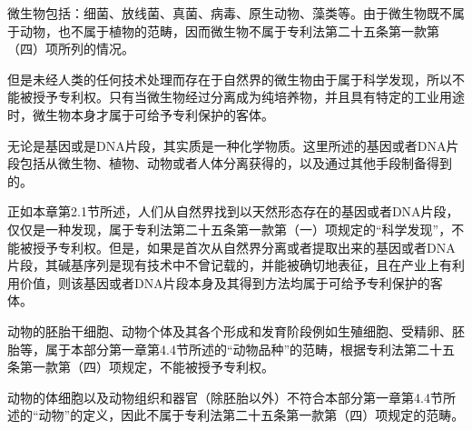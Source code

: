 微生物包括：细菌、放线菌、真菌、病毒、原生动物、藻类等。由于微生物既不属于动物，也不属于植物的范畴，因而微生物不属于专利法第二十五条第一款第（四）项所列的情况。

但是未经人类的任何技术处理而存在于自然界的微生物由于属于科学发现，所以不能被授予专利权。只有当微生物经过分离成为纯培养物，并且具有特定的工业用途时，微生物本身才属于可给予专利保护的客体。

无论是基因或是DNA片段，其实质是一种化学物质。这里所述的基因或者DNA片段包括从微生物、植物、动物或者人体分离获得的，以及通过其他手段制备得到的。

正如本章第2.1节所述，人们从自然界找到以天然形态存在的基因或者DNA片段，仅仅是一种发现，属于专利法第二十五条第一款第（一）项规定的“科学发现”，不能被授予专利权。但是，如果是首次从自然界分离或者提取出来的基因或者DNA片段，其碱基序列是现有技术中不曾记载的，并能被确切地表征，且在产业上有利用价值，则该基因或者DNA片段本身及其得到方法均属于可给予专利保护的客体。

动物的胚胎干细胞、动物个体及其各个形成和发育阶段例如生殖细胞、受精卵、胚胎等，属于本部分第一章第4.4节所述的“动物品种”的范畴，根据专利法第二十五条第一款第（四）项规定，不能被授予专利权。

动物的体细胞以及动物组织和器官（除胚胎以外）不符合本部分第一章第4.4节所述的“动物”的定义，因此不属于专利法第二十五条第一款第（四）项规定的范畴。





